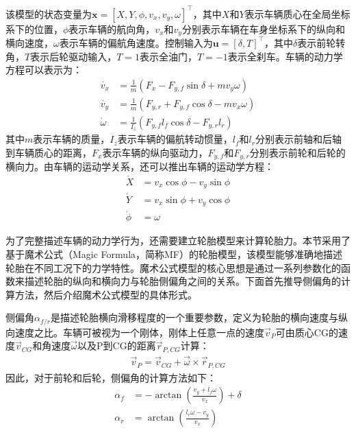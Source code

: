 该模型的状态变量为$\boldsymbol{x}=[X,Y,\phi, v_x,v_y,\omega]^\top$，其中$X$和$Y$表示车辆质心在全局坐标系下的位置，$\phi$表示车辆的航向角，$v_x$和$v_y$分别表示车辆在车身坐标系下的纵向和横向速度，$\omega$表示车辆的偏航角速度。控制输入为$\boldsymbol{u}=[\delta, T]^\top$，其中$\delta$表示前轮转角，$T$表示后轮驱动输入，$T=1$表示全油门，$T=-1$表示全刹车。车辆的动力学方程可以表示为：
\begin{equation}
\begin{aligned}
    \dot{v_x}&=\frac{1}{m}(F_x-F_{y,f}\sin{\delta}+mv_y\omega)\\
    \dot{v_y}&=\frac{1}{m}(F_{y,r}+F_{y,f}\cos{\delta}-mv_x\omega)\\
    \dot{\omega}&=\frac{1}{I_z}(F_{y,f}l_f\cos{\delta}-F_{y,r}l_r)
\end{aligned}
\label{equ:car-dynamics}
\end{equation}
其中$m$表示车辆的质量，$I_z$表示车辆的偏航转动惯量，$l_f$和$l_r$分别表示前轴和后轴到车辆质心的距离，$F_x$表示车辆的纵向驱动力，$F_{y,f}$和$F_{y,r}$分别表示前轮和后轮的横向力。由车辆的运动学关系，还可以推出车辆的运动学方程：
\begin{equation}
\begin{aligned}
    \dot{X}&=v_x\cos{\phi}-v_y\sin{\phi}\\
    \dot{Y}&=v_x\sin{\phi}+v_y\cos{\phi}\\
    \dot{\phi}&=\omega
\end{aligned}
\end{equation}

为了完整描述车辆的动力学行为，还需要建立轮胎模型来计算轮胎力。本节采用了基于魔术公式（Magic Formula，简称MF）的轮胎模型\cite{pacejka2005tire}，该模型能够准确地描述轮胎在不同工况下的力学特性。魔术公式模型的核心思想是通过一系列参数化的函数来描述轮胎的纵向和横向力与轮胎侧偏角之间的关系。下面首先推导侧偏角的计算方法，然后介绍魔术公式模型的具体形式。

侧偏角$\alpha_{f/r}$是描述轮胎横向滑移程度的一个重要参数，定义为轮胎的横向速度与纵向速度之比。车辆可被视为一个刚体，刚体上任意一点的速度$\vec{v}_P$可由质心CG的速度$\vec{v}_{CG}$和角速度$\vec{\omega}$以及P到CG的距离$\vec{r}_{P,CG}$计算：
\begin{equation}
\begin{aligned}
    \vec{v}_P=\vec{v}_{CG}+\vec{\omega}\times \vec{r}_{P,CG}
\end{aligned}
\end{equation}
因此，对于前轮和后轮，侧偏角的计算方法如下：
\begin{equation}
\begin{aligned}
    \alpha_{f}&=-\arctan{\left(\frac{v_y+l_f\omega}{v_x}\right)}+\delta\\
    \alpha_{r}&=\arctan{\left(\frac{l_r\omega-v_y}{v_x}\right)}
\end{aligned}
\label{equ:slip-angle}
\end{equation}

